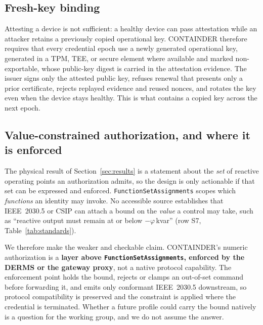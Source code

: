 \subsection{Fresh-key binding}
Attesting a device is not sufficient: a healthy device can pass attestation while an attacker
retains a previously copied operational key. CONTAINDER therefore requires that every credential
epoch use a newly generated operational key, generated in a TPM, TEE, or secure element where
available and marked non-exportable, whose public-key digest is carried in the attestation
evidence. The issuer signs only the attested public key, refuses renewal that presents only a
prior certificate, rejects replayed evidence and reused nonces, and rotates the key even when the
device stays healthy. This is what contains a copied key across the next epoch.

\subsection{Value-constrained authorization, and where it is enforced}
The physical result of Section~\ref{sec:results} is a statement about the \emph{set} of reactive
operating points an authorization admits, so the design is only actionable if that set can be
expressed and enforced. \texttt{FunctionSetAssignments} scopes which \emph{functions} an identity
may invoke. No accessible source establishes that IEEE~2030.5 or CSIP can attach a bound on the
\emph{value} a control may take, such as ``reactive output must remain at or below
$-\varphi$\,kvar'' (row S7, Table~\ref{tab:standards}).

We therefore make the weaker and checkable claim. CONTAINDER's numeric authorization is a
\textbf{layer above \texttt{FunctionSetAssignments}, enforced by the DERMS or the gateway proxy},
not a native protocol capability. The enforcement point holds the bound, rejects or clamps an
out-of-set command before forwarding it, and emits only conformant IEEE~2030.5 downstream, so
protocol compatibility is preserved and the constraint is applied where the credential is
terminated. Whether a future profile could carry the bound natively is a question for the working
group, and we do not assume the answer.

